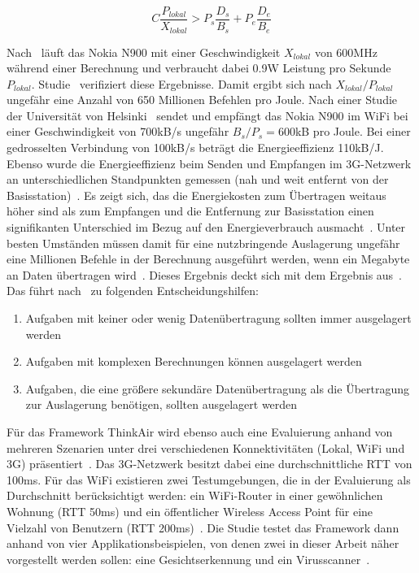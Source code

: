 \documentclass{sigchi}
\begin{document}
\begin{equation*}
	C\frac{P_{\textit{lokal}}}{X_{\textit{lokal}}} > P_s\frac{D_s}{B_s} + P_e\frac{D_e}{B_e}
\end{equation*}

Nach~\cite{o8} läuft das Nokia N900 mit einer Geschwindigkeit $X_{\textit{lokal}}$ von 600MHz während einer Berechnung und verbraucht dabei 0.9W Leistung pro Sekunde $P_{\textit{lokal}}$.
Studie~\cite{o12} verifiziert diese Ergebnisse.
Damit ergibt sich nach $X_{\textit{lokal}}/P_{\textit{lokal}}$ ungefähr eine Anzahl von 650 Millionen Befehlen pro Joule.
Nach einer Studie der Universität von Helsinki~\cite{o8} sendet und empfängt das Nokia N900 im WiFi bei einer Geschwindigkeit von 700kB/s ungefähr $B_s/P_s = $600kB pro Joule.
Bei einer gedrosselten Verbindung von 100kB/s beträgt die Energieeffizienz 110kB/J.
Ebenso wurde die Energieeffizienz beim Senden und Empfangen im 3G-Netzwerk an unterschiedlichen Standpunkten gemessen (nah und weit entfernt von der Basisstation)~\cite{o12}.
Es zeigt sich, das die Energiekosten zum Übertragen weitaus höher sind als zum Empfangen und die Entfernung zur Basisstation einen signifikanten Unterschied im Bezug auf den Energieverbrauch ausmacht~\cite{o12}.
Unter besten Umständen müssen damit für eine nutzbringende Auslagerung ungefähr eine Millionen Befehle in der Berechnung ausgeführt werden, wenn ein Megabyte an Daten übertragen wird~\cite{o12}.
Dieses Ergebnis deckt sich mit dem Ergebnis aus~\cite{o8}.
Das führt nach~\cite{o8} zu folgenden Entscheidungshilfen:
\begin{enumerate}
	\item Aufgaben mit keiner oder wenig Datenübertragung sollten immer ausgelagert werden
	\item Aufgaben mit komplexen Berechnungen können ausgelagert werden
	\item Aufgaben, die eine größere sekundäre Datenübertragung als die Übertragung zur Auslagerung benötigen, sollten ausgelagert werden
\end{enumerate}

Für das Framework ThinkAir wird ebenso auch eine Evaluierung anhand von mehreren Szenarien unter drei verschiedenen Konnektivitäten (Lokal, WiFi und 3G) präsentiert~\cite{thinkair}.
Das 3G-Netzwerk besitzt dabei eine durchschnittliche RTT von 100ms.
Für das WiFi existieren zwei Testumgebungen, die in der Evaluierung als Durchschnitt berücksichtigt werden: ein WiFi-Router in einer gewöhnlichen Wohnung (RTT 50ms) und ein öffentlicher Wireless Access Point für eine Vielzahl von Benutzern (RTT 200ms)~\cite{thinkair}.
Die Studie testet das Framework dann anhand von vier Applikationsbeispielen, von denen zwei in dieser Arbeit näher vorgestellt werden sollen: eine Gesichtserkennung und ein Virusscanner~\cite{thinkair}.
\end{document}
